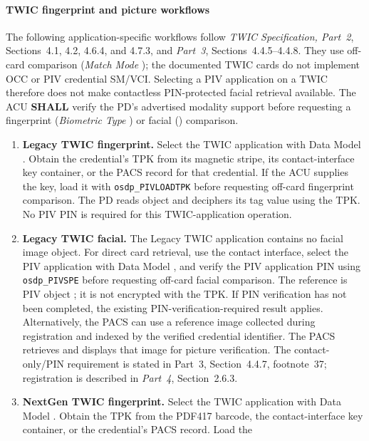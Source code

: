\paragraph{TWIC fingerprint and picture workflows}
The following application-specific workflows follow \emph{TWIC Specification,
Part~2}, Sections~4.1, 4.2, 4.6.4, and 4.7.3, and \emph{Part~3},
Sections~4.4.5--4.4.8. They use off-card comparison
(\emph{Match Mode} ); the documented TWIC cards do not implement
OCC or PIV credential SM/VCI. Selecting a PIV application on a TWIC therefore
does not make contactless PIN-protected facial retrieval available.
The ACU \textbf{SHALL} verify the PD's advertised modality support before
requesting a fingerprint (\emph{Biometric Type} ) or facial
() comparison.

\begin{enumerate}
  \item \textbf{Legacy TWIC fingerprint.} Select the TWIC application with
    Data Model . Obtain the credential's TPK from its magnetic stripe,
    its contact-interface key container, or the PACS record for that credential.
    If the ACU supplies the key, load it with \texttt{osdp\_PIVLOADTPK} before
    requesting off-card fingerprint comparison. The PD reads object
     and deciphers its tag  value using the TPK.
    No PIV PIN is required for this TWIC-application operation.
  \item \textbf{Legacy TWIC facial.} The Legacy TWIC application contains no
    facial image object. For direct card retrieval, use the contact interface,
    select the PIV application with Data Model , and verify the PIV
    application PIN using \texttt{osdp\_PIVSPE} before requesting off-card facial
    comparison. The reference is PIV object ; it is not encrypted
    with the TPK. If PIN verification has not been completed, the existing
    PIN-verification-required result applies. Alternatively,
    the PACS can use a reference image collected during registration and indexed
    by the verified credential identifier. The PACS retrieves and displays that
    image for picture verification. The contact-only/PIN
    requirement is stated in Part~3, Section~4.4.7, footnote~37; registration is
    described in \emph{Part~4}, Section~2.6.3.
  \item \textbf{NextGen TWIC fingerprint.} Select the TWIC application with
    Data Model . Obtain the TPK from the PDF417 barcode, the
    contact-interface key container, or the credential's PACS record. Load the

\end{enumerate}
